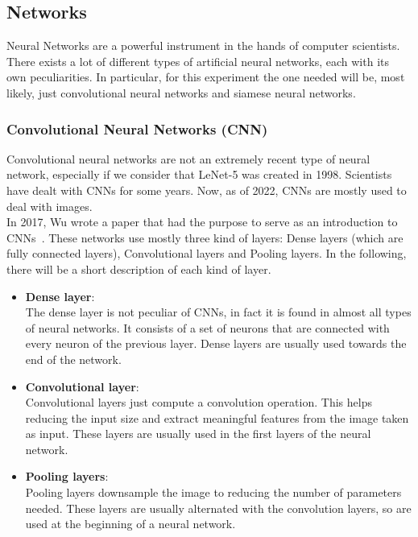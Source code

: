 \documentclass[conference]{IEEEtran}
\begin{document}
			\subsection{Networks}
			
				\noindent Neural Networks are a powerful instrument in the hands of computer scientists. There exists a lot of different types of artificial neural networks, each with its own peculiarities. In particular, for this 
				experiment the one needed will be, most likely, just convolutional neural networks and siamese neural networks. 
			
				\subsubsection{Convolutional Neural Networks (CNN)}
				
					Convolutional neural networks are not an extremely recent type of neural network, especially if we consider that LeNet-5 was created in 1998. Scientists have dealt with CNNs for some years. Now, as of 2022, 
					CNNs are mostly used to deal with images.\\
					In 2017, Wu wrote a paper that had the purpose to serve as an introduction to CNNs~\cite{wu2017introduction}. These networks use mostly three kind of layers: Dense layers (which are fully connected layers), 
					Convolutional layers and Pooling layers. In the following, there will be a short description of each kind of layer. 
					\begin{itemize}
						
						\item \textbf{Dense layer}:\\
							The dense layer is not peculiar of CNNs, in fact it is found in almost all types of neural networks. It consists of a set of neurons that are connected with every neuron of the previous 
							layer. Dense layers are usually used towards the end of the network.
						
						\item \textbf{Convolutional layer}:\\
							Convolutional layers just compute a convolution operation. This helps reducing the input size and extract meaningful features from the image taken as input. These layers are usually used 
							in the first layers of the neural network.
						
						\item \textbf{Pooling layers}:\\
							Pooling layers downsample the image to reducing the number of parameters needed. These layers are usually alternated with the convolution layers, so are used at the beginning of a neural network.
							
					\end{itemize}
					
\end{document}

